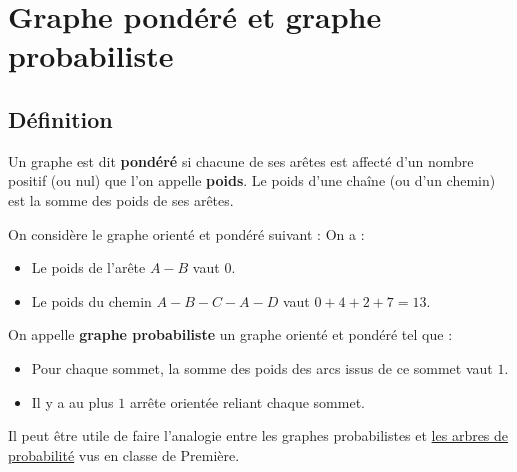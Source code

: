 


	
	\section{Graphe pondéré et graphe probabiliste}
	
	\subsection{Définition}
	
	\begin{formula}
		Un graphe est dit \textbf{pondéré} si chacune de ses arêtes est affecté d'un nombre positif (ou nul) que l'on appelle \textbf{poids}.
		\newpar
		Le poids d'une chaîne (ou d'un chemin) est la somme des poids de ses arêtes.
	\end{formula}
	
	\begin{tip}[Exemple]
		On considère le graphe orienté et pondéré suivant :
		On a :
		\begin{itemize}
			\item Le poids de l'arête $A-B$ vaut $0$.
			\item Le poids du chemin $A-B-C-A-D$ vaut $0+4+2+7 = 13$.
		\end{itemize}
	\end{tip}
	
	\begin{formula}
		On appelle \textbf{graphe probabiliste} un graphe orienté et pondéré tel que :
		\begin{itemize}
			\item Pour chaque sommet, la somme des poids des arcs issus de ce sommet vaut $1$.
			\item Il y a au plus $1$ arrête orientée reliant chaque sommet.
		\end{itemize}
	\end{formula}
	
	Il peut être utile de faire l'analogie entre les graphes probabilistes et \href{https://bacomathiqu.es/cours/premiere/probabilites/#arbre-de-probabilit\%C3\%A9}{les arbres de probabilité} vus en classe de Première.
	
